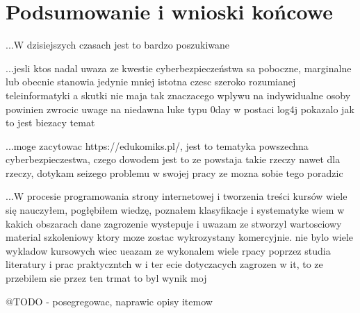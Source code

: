 \documentclass[12pt,twoside]{article}
\begin{document}

\section{Podsumowanie i wnioski końcowe}

...W dzisiejszych czasach jest to bardzo poszukiwane

...jesli ktos nadal uwaza ze kwestie cyberbezpieczeństwa sa poboczne, marginalne lub obecnie stanowia jedynie mniej istotna czesc szeroko rozumianej teleinformatyki a skutki nie maja tak znaczacego wplywu na indywidualne osoby powinien zwrocic uwage na niedawna luke typu 0day w postaci log4j pokazalo jak to jest biezacy temat

...moge zacytowac https://edukomiks.pl/, jest to tematyka powszechna cyberbezpieczestwa, czego dowodem jest to ze powstaja takie rzeczy nawet dla rzeczy, dotykam seizego problemu w swojej pracy ze mozna sobie tego poradzic

...W procesie programowania strony internetowej i tworzenia treści kursów wiele się nauczyłem, pogłębiłem wiedzę, poznałem klasyfikacje i systematyke wiem w kakich obszarach dane zagrozenie wystepuje i uwazam ze stworzyl wartosciowy material szkoleniowy ktory moze zostac wykrozystany komercyjnie. nie bylo wiele wykladow kursowych wiec ueazam ze wykonalem wiele rpacy poprzez studia literatury i prac praktyczntch w i ter ecie dotyczacych zagrozen w it, to ze przebilem sie przez ten trmat to byl wynik moj
\clearpage


@TODO - posegregowac, naprawic opisy itemow
\end{document}
